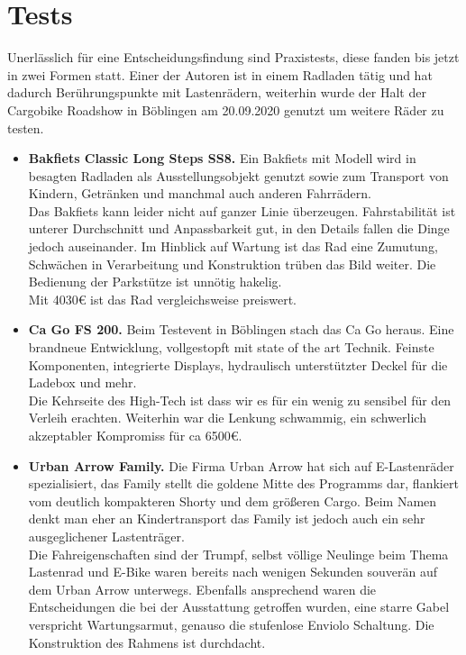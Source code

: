 \documentclass[a4paper,ngerman, 14pt] {scrartcl}
\begin{document}
\section{Tests}
Unerlässlich für eine Entscheidungsfindung sind Praxistests, diese fanden bis jetzt in zwei Formen statt. Einer der Autoren ist in einem Radladen tätig und hat dadurch Berührungspunkte mit Lastenrädern, weiterhin wurde der Halt der Cargobike Roadshow in Böblingen am 20.09.2020 genutzt um weitere Räder zu testen.
\begin{itemize}
    \item \textbf{Bakfiets Classic Long Steps SS8.} Ein Bakfiets mit Modell wird in besagten Radladen als Ausstellungsobjekt genutzt sowie zum Transport von Kindern, Getränken und manchmal auch anderen Fahrrädern.\\
    Das Bakfiets kann leider nicht auf ganzer Linie überzeugen. Fahrstabilität ist unterer Durchschnitt und Anpassbarkeit gut, in den Details fallen die Dinge jedoch auseinander. Im Hinblick auf Wartung ist das Rad eine Zumutung, Schwächen in Verarbeitung und Konstruktion trüben das Bild weiter. Die Bedienung der Parkstütze ist unnötig hakelig.\\ Mit 4030€ ist das Rad vergleichsweise preiswert.
    \item \textbf{Ca Go FS 200.} Beim Testevent in Böblingen stach das Ca Go heraus. Eine brandneue Entwicklung, vollgestopft mit state of the art Technik. Feinste Komponenten, integrierte Displays, hydraulisch unterstützter Deckel für die Ladebox und mehr.\\
    Die Kehrseite des High-Tech ist dass wir es für ein wenig zu sensibel für den Verleih erachten. Weiterhin war die Lenkung schwammig, ein schwerlich akzeptabler Kompromiss für ca 6500€.
    \item \textbf{Urban Arrow Family.} Die Firma Urban Arrow hat sich auf E-Lastenräder spezialisiert, das Family stellt die goldene Mitte des Programms dar, flankiert vom deutlich kompakteren Shorty und dem größeren Cargo. Beim Namen denkt man eher an Kindertransport das Family ist jedoch auch ein sehr ausgeglichener Lastenträger.\\
   Die Fahreigenschaften sind der Trumpf, selbst völlige Neulinge beim Thema Lastenrad und E-Bike waren bereits nach wenigen Sekunden souverän auf dem Urban Arrow unterwegs. Ebenfalls ansprechend waren die Entscheidungen die bei der Ausstattung getroffen wurden, eine starre Gabel verspricht Wartungsarmut, genauso die stufenlose Enviolo Schaltung. Die Konstruktion des Rahmens ist durchdacht.\\

\end{itemize}
\end{document}
